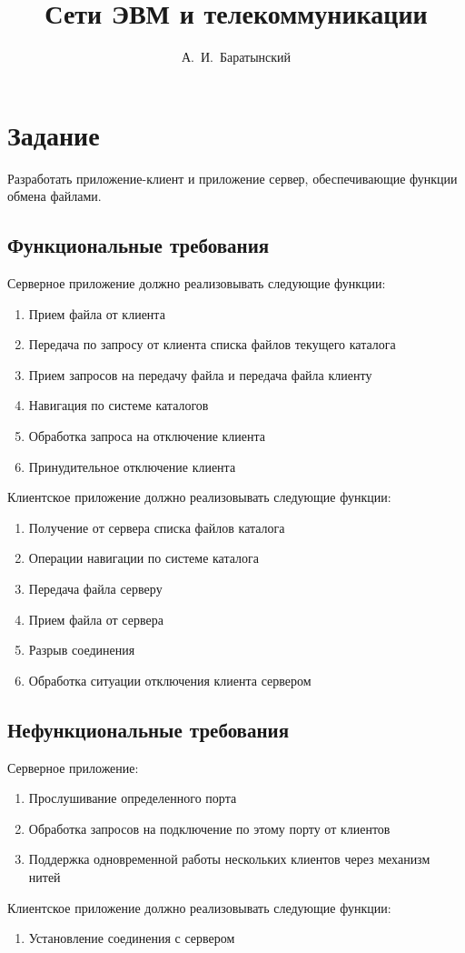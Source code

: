 \documentclass[12pt,a4paper]{report}
\author{А.~И.~Баратынский}
\title{Сети ЭВМ и телекоммуникации}
\begin{document}
\maketitle
\chapter{Задание}
Разработать приложение-клиент и приложение сервер, обеспечивающие функции обмена файлами.
\section{Функциональные требования}
Серверное приложение должно реализовывать следующие функции:
\begin{enumerate}
\item{Прием файла от клиента}
\item{Передача по запросу от клиента списка файлов текущего каталога}
\item{Прием запросов на передачу файла и передача файла клиенту}
\item{Навигация по системе каталогов}
\item{Обработка запроса на отключение клиента}
\item{Принудительное отключение клиента}
\end{enumerate}

Клиентское приложение должно реализовывать следующие функции:
\begin{enumerate}
\item{Получение от сервера списка файлов каталога}
\item{Операции навигации по системе каталога}
\item{Передача файла серверу}
\item{Прием файла от сервера}
\item{Разрыв соединения}
\item{Обработка ситуации отключения клиента сервером}
\end{enumerate}

\section{Нефункциональные требования}
Серверное приложение:
\begin{enumerate}
\item{Прослушивание определенного порта}
\item{Обработка запросов на подключение по этому порту от клиентов}
\item{Поддержка одновременной работы нескольких клиентов через механизм нитей}
\end{enumerate}
Клиентское приложение должно реализовывать следующие функции:
\begin{enumerate}
\item{Установление соединения с сервером}
\end{enumerate}
\end{document}
